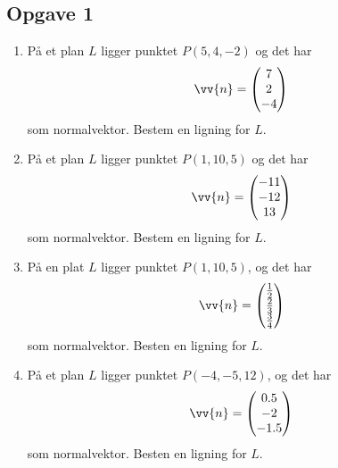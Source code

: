 
\subsection*{Opgave 1}
\begin{enumerate}[label=\roman*)]
	\item På et plan $L$ ligger punktet $P(5,4,-2)$ og det har 
	\begin{align*}
		\vv{n} = 
		\begin{pmatrix}
			7 \\ 2 \\ -4
		\end{pmatrix} 
	\end{align*}
	som normalvektor. Bestem en ligning for $L$. 
	\item På et plan $L$ ligger punktet $P(1,10,5)$ og det har 
	\begin{align*}
		\vv{n} = 
		\begin{pmatrix}
			-11 \\ -12 \\ 13
		\end{pmatrix} 
	\end{align*}
	som normalvektor. Bestem en ligning for $L$.
	\item På en plat $L$ ligger punktet $P(1,10,5)$, og det har 
	\begin{align*}
		\vv{n} =
		\begin{pmatrix}
			\frac{1}{2} \\ \frac{2}{3} \\ \frac{3}{4}
		\end{pmatrix}
	\end{align*}
	som normalvektor. Besten en ligning for $L$.
	\item På et plan $L$ ligger punktet $P(-4,-5,12)$, og det har 
	\begin{align*}
		\vv{n} =
		\begin{pmatrix}
			0.5 \\ -2 \\ -1.5
		\end{pmatrix}
	\end{align*}
	som normalvektor. Besten en ligning for $L$.
\end{enumerate}


